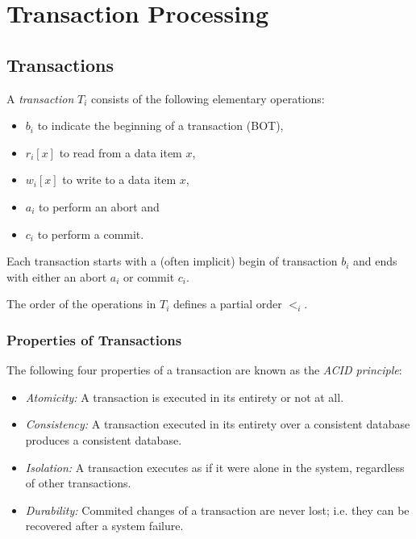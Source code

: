 

\section{Transaction Processing}




\subsection{Transactions}

A \emph{transaction} $T_i$ consists of the following elementary operations:
\begin{itemize}
\item $b_i$ to indicate the beginning of a transaction (BOT),
\item $r_i[x]$ to read from a data item $x$,
\item $w_i[x]$ to write to a data item $x$,
\item $a_i$ to perform an abort and
\item $c_i$ to perform a commit.
\end{itemize}
Each transaction starts with a (often implicit) begin of transaction $b_i$ and ends with either an abort $a_i$ or commit $c_i$.

The order of the operations in $T_i$ defines a partial order $<_i$.




\subsubsection{Properties of Transactions}

The following four properties of a transaction are known as the \emph{ACID principle}:

\begin{itemize}
\item \emph{Atomicity:} A transaction is executed in its entirety or not at all.
\item \emph{Consistency:} A transaction executed in its entirety over a consistent database produces a consistent database.
\item \emph{Isolation:} A transaction executes as if it were alone in the system, regardless of other transactions.
\item \emph{Durability:} Commited changes of a transaction are never lost; i.e. they can be recovered after a system failure.
\end{itemize}



